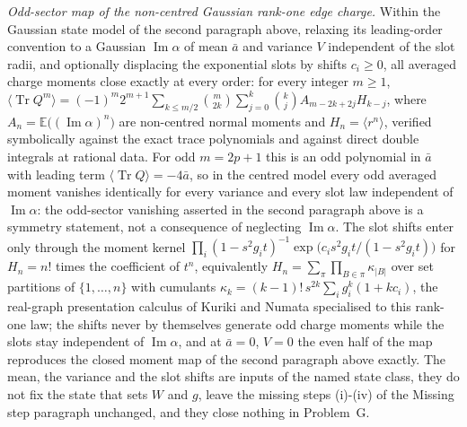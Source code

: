 \emph{Odd-sector map of the non-centred Gaussian rank-one edge charge.} Within the Gaussian state model of the second paragraph above, relaxing its leading-order convention to a Gaussian \(\operatorname{Im}\alpha\) of mean \(\bar a\) and variance \(V\) independent of the slot radii, and optionally displacing the exponential slots by shifts \(c_i\ge0\), all averaged charge moments close exactly at every order: for every integer \(m\ge1\), \(\langle\operatorname{Tr}Q^{m}\rangle=(-1)^{m}2^{m+1}\sum_{k\le m/2}\binom{m}{2k}\sum_{j=0}^{k}\binom{k}{j}A_{m-2k+2j}H_{k-j}\), where \(A_n=\mathbb{E}\bigl((\operatorname{Im}\alpha)^{n}\bigr)\) are non-centred normal moments and \(H_n=\langle r^{n}\rangle\), verified symbolically against the exact trace polynomials and against direct double integrals at rational data. For odd \(m=2p+1\) this is an odd polynomial in \(\bar a\) with leading term \(\langle\operatorname{Tr}Q\rangle=-4\bar a\), so in the centred model every odd averaged moment vanishes identically for every variance and every slot law independent of \(\operatorname{Im}\alpha\): the odd-sector vanishing asserted in the second paragraph above is a symmetry statement, not a consequence of neglecting \(\operatorname{Im}\alpha\). The slot shifts enter only through the moment kernel \(\prod_i(1-s^{2}g_i t)^{-1}\exp\bigl(c_i s^{2}g_i t/(1-s^{2}g_i t)\bigr)\) for \(H_n=n!\) times the coefficient of \(t^{n}\), equivalently \(H_n=\sum_{\pi}\prod_{B\in\pi}\kappa_{|B|}\) over set partitions of \(\{1,\dots,n\}\) with cumulants \(\kappa_k=(k-1)!\,s^{2k}\sum_i g_i^{k}(1+k c_i)\), the real-graph presentation calculus of Kuriki and Numata specialised to this rank-one law; the shifts never by themselves generate odd charge moments while the slots stay independent of \(\operatorname{Im}\alpha\), and at \(\bar a=0\), \(V=0\) the even half of the map reproduces the closed moment map of the second paragraph above exactly. The mean, the variance and the slot shifts are inputs of the named state class, they do not fix the state that sets \(W\) and \(g\), leave the missing steps (i)-(iv) of the Missing step paragraph unchanged, and they close nothing in Problem~G.

